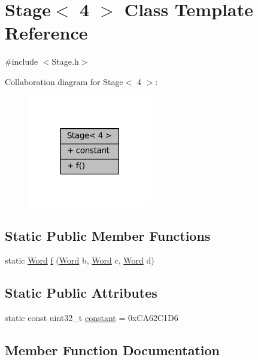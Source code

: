 \hypertarget{class_stage_3_014_01_4}{}\section{Stage$<$ 4 $>$ Class Template Reference}
\label{class_stage_3_014_01_4}


{\ttfamily \#include $<$Stage.\+h$>$}



Collaboration diagram for Stage$<$ 4 $>$\+:
\nopagebreak
\begin{figure}[H]
\begin{center}
\leavevmode
\includegraphics[width=153pt]{class_stage_3_014_01_4__coll__graph}
\end{center}
\end{figure}
\subsection*{Static Public Member Functions}
\begin{DoxyCompactItemize}
\item 
static \mbox{\hyperlink{class_word}{Word}} \mbox{\hyperlink{class_stage_3_014_01_4_a9175fae6689f38178d695ccb5f462688}{f}} (\mbox{\hyperlink{class_word}{Word}} b, \mbox{\hyperlink{class_word}{Word}} c, \mbox{\hyperlink{class_word}{Word}} d)
\end{DoxyCompactItemize}
\subsection*{Static Public Attributes}
\begin{DoxyCompactItemize}
\item 
static const uint32\+\_\+t \mbox{\hyperlink{class_stage_3_014_01_4_aca035db96d832a797eca116a6e5bf9fd}{constant}} = 0x\+C\+A62\+C1\+D6
\end{DoxyCompactItemize}


\subsection{Member Function Documentation}
\mbox{\label{class_stage_3_014_01_4_a9175fae6689f38178d695ccb5f462688}} 
